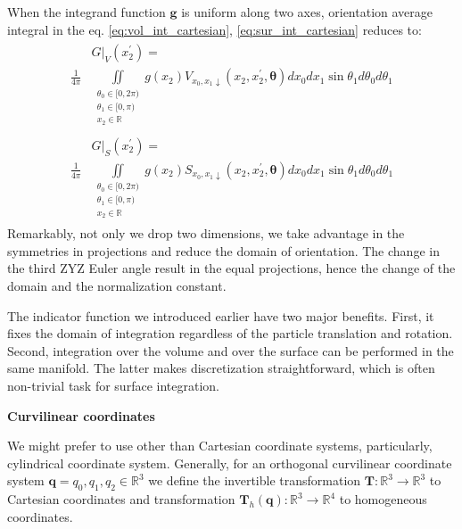 \documentclass[10pt, a4paper]{article}
\begin{document}
\begin{multicols}{2}
When the integrand function $\bm{g}$ is uniform along two axes, orientation average integral in the eq. \ref{eq:vol_int_cartesian}, \ref{eq:sur_int_cartesian} reduces to:
\begin{gather}
    \begin{aligned}
        &\left.G\right|_V (x_2^{\prime}) = \\
        \frac{1}{4\pi} &\iint \limits_{
            \substack{  \theta_0 \in [0, 2\pi) \\
                        \theta_1 \in [0, \pi) \\
                        x_2 \in \mathbb{R}
                        }}
        g(x_2) V_{x_0, x_1 \downarrow}(x_2, x^{\prime}_2, \bm{\theta}) dx_0 dx_1 \sin \theta_1 d\theta_0 d\theta_1
    \end{aligned}
    \\
    \begin{aligned}
        &\left.G\right|_S (x_2^{\prime}) = \\
        \frac{1}{4\pi} &\iint \limits_{
            \substack{  \theta_0 \in [0, 2\pi) \\
                        \theta_1 \in [0, \pi) \\
                        x_2 \in \mathbb{R}
                        }}
        g(x_2) S_{x_0, x_1 \downarrow}(x_2, x^{\prime}_2, \bm{\theta}) dx_0 dx_1 \sin \theta_1 d\theta_0 d\theta_1
    \end{aligned}
\end{gather}
Remarkably, not only we drop two dimensions, we take advantage in the symmetries in projections and reduce the domain of orientation.
The change in the third ZYZ Euler angle result in the equal projections, hence the change of the domain and the normalization constant.

The indicator function we introduced earlier have two major benefits.
First, it fixes the domain of integration regardless of the particle translation and rotation.
Second, integration over the volume and over the surface can be performed in the same manifold.
The latter makes discretization straightforward, which is often non-trivial task for surface integration.

\textbf{Curvilinear coordinates}

We might prefer to use other than Cartesian coordinate systems, particularly, cylindrical coordinate system.
Generally, for an orthogonal curvilinear coordinate system $\bm{q} = q_0, q_1, q_2 \in \mathbb{R}^3$ we define the invertible transformation $\bm{T}:\mathbb{R}^3 \to \mathbb{R}^3$ to Cartesian coordinates and transformation $\bm{T}_h(\bm{q}):\mathbb{R}^3 \to \mathbb{R}^4$ to homogeneous coordinates.


\end{multicols}
\end{document}
